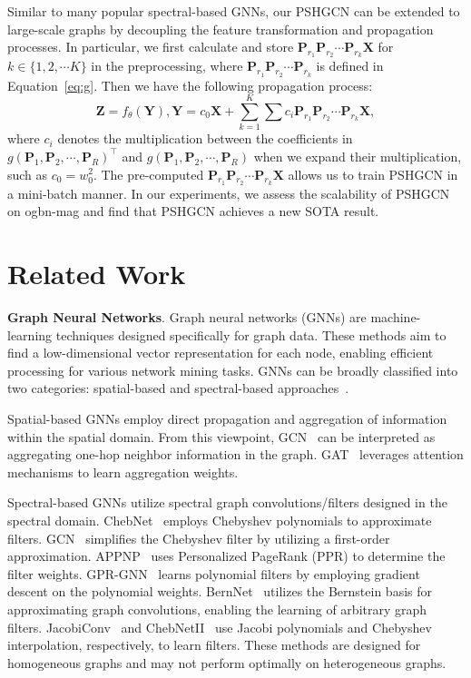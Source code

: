 \documentclass{article}
\begin{document}
Similar to many popular spectral-based GNNs, our PSHGCN can be extended to large-scale graphs by decoupling the feature transformation and propagation processes. In particular, we first calculate and store $\mathbf{P}_{r_1}\mathbf{P}_{r_2}\cdots\mathbf{P}_{r_k}\mathbf{X}$ for $k \in \{1,2,\cdots K\}$ in the preprocessing, where $\mathbf{P}_{r_1}\mathbf{P}_{r_2}\cdots\mathbf{P}_{r_k}$ is defined in Equation~\eqref{eq:g}. Then we have the following propagation process:
\begin{equation} \label{eq:pshgcn_scale}
    \mathbf{Z}=f_{\theta}(\mathbf{Y}), \mathbf{Y} = c_0\mathbf{X}+\sum\limits_{k=1}^{K}\sum c_i\mathbf{P}_{r_1}\mathbf{P}_{r_2}\cdots\mathbf{P}_{r_k}\mathbf{X},
\end{equation}
where $c_i$ denotes the multiplication between the coefficients in $g(\mathbf{P}_1,\mathbf{P}_2,\cdots,\mathbf{P}_R)^{\top}$ and $g(\mathbf{P}_1,\mathbf{P}_2,\cdots,\mathbf{P}_R)$ when we expand their multiplication, such as $c_0 = w_0^2$. The pre-computed $\mathbf{P}_{r_1}\mathbf{P}_{r_2}\cdots\mathbf{P}_{r_k}\mathbf{X}$ allows us to train PSHGCN in a mini-batch manner.  In our experiments, we assess the scalability of PSHGCN on ogbn-mag and find that PSHGCN achieves a new SOTA result. 











\section{Related Work}
\textbf{Graph Neural Networks}. Graph neural networks (GNNs) are machine-learning techniques designed specifically for graph data. These methods aim to find a low-dimensional vector representation for each node, enabling efficient processing for various network mining tasks. GNNs can be broadly classified into two categories: spatial-based and spectral-based approaches~\cite{wu2020comprehensive}. 

Spatial-based GNNs employ direct propagation and aggregation of information within the spatial domain. From this viewpoint, GCN~\cite{gcn} can be interpreted as aggregating one-hop neighbor information in the graph. GAT~\cite{gat} leverages attention mechanisms to learn aggregation weights. 


Spectral-based GNNs utilize spectral graph convolutions/filters designed in the spectral domain. ChebNet~\cite{Chebnet} employs Chebyshev polynomials to approximate filters. GCN~\cite{gcn} simplifies the Chebyshev filter by utilizing a first-order approximation. APPNP~\cite{appnp} uses Personalized PageRank (PPR) to determine the filter weights.  GPR-GNN~\cite{gprgnn} learns polynomial filters by employing gradient descent on the polynomial weights. BernNet~\cite{bernnet} utilizes the Bernstein basis for approximating graph convolutions, enabling the learning of arbitrary graph filters.
JacobiConv~\cite{jacobi} and ChebNetII~\cite{chebnetii} use Jacobi polynomials and Chebyshev interpolation, respectively, to learn filters. These methods are designed for homogeneous graphs and may not perform optimally on heterogeneous graphs.
\end{document}
